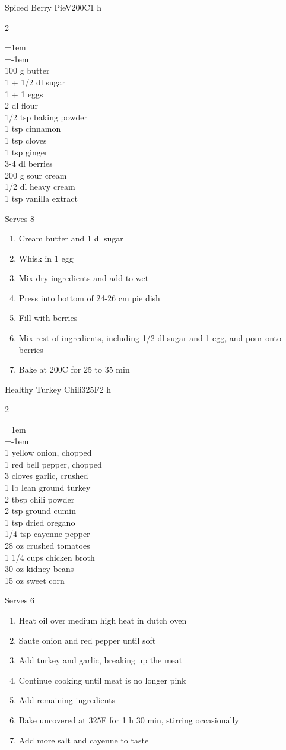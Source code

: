 \documentclass{article}
\newenvironment{recipe}[3][]
    {\begin{cardbase}[#1]{#2}{#3}
    \columnratio{0.333}
    \begin{paracol}{2}}
    {\end{paracol}\end{cardbase}}
\newenvironment{denserecipe}[3][]
    {\small
    \begin{recipe}[#1]{#2}{#3}}
    {\end{recipe}}
\newcommand{\nextcolumn}{\switchcolumn}
\newenvironment{ingredients}
    {
    \begin{obeylines}
    \vspace{\parskip}
    \setlength{\parskip}{0.25em}
    \vspace{-0.25em}
    \leftskip=1em
    \parindent=-1em}
    {\end{obeylines}}
\newenvironment{steps}
    {\begin{enumerate}[leftmargin=*,topsep=0pt]}
    {\end{enumerate}}
\newcommand{\celsius}[1]{#1\textdegree{}C}
\newcommand{\fahrenheit}[1]{#1\textdegree{}F}
\newcommand{\tag}[1]{\hspace{1em}#1}
\newcommand{\symboltag}[2]{\tag{#1\hspace{0.4em}#2}}
\newcommand{\totaltime}[1]{\symboltag{\raisebox{-0.1em}{\small\StopWatchEnd}}{#1}}
\newcommand{\preheat}[1]{\symboltag{\Topbottomheat}{#1}}
\begin{document}
\begin{denserecipe}{Spiced Berry Pie}{\tag{V}\preheat{\celsius{200}}\totaltime{1 h}}
\begin{ingredients}
100 g butter
1 + 1/2 dl sugar
1 + 1 eggs
2 dl flour
1/2 tsp baking powder
1 tsp cinnamon
1 tsp cloves
1 tsp ginger
3-4 dl berries
200 g sour cream
1/2 dl heavy cream
1 tsp vanilla extract
\end{ingredients}
\nextcolumn
Serves 8
\begin{steps}
    \item Cream butter and 1 dl sugar
    \item Whisk in 1 egg
    \item Mix dry ingredients and add to wet
    \item Press into bottom of 24-26 cm pie dish
    \item Fill with berries
    \item Mix rest of ingredients, including 1/2 dl sugar and 1 egg, and pour onto berries
    \item Bake at \celsius{200} for 25 to 35 min
\end{steps}
\end{denserecipe}

\begin{denserecipe}{Healthy Turkey Chili}{\preheat{\fahrenheit{325}\totaltime{2 h}}}
\begin{ingredients}
1 yellow onion, chopped
1 red bell pepper, chopped
3 cloves garlic, crushed
1 lb lean ground turkey
2 tbsp chili powder
2 tsp ground cumin
1 tsp dried oregano
1/4 tsp cayenne pepper
28 oz crushed tomatoes
1 1/4 cups chicken broth
30 oz kidney beans
15 oz sweet corn
\end{ingredients}
\nextcolumn
Serves 6
\begin{steps}
    \item Heat oil over medium high heat in dutch oven
    \item Saute onion and red pepper until soft
    \item Add turkey and garlic, breaking up the meat
    \item Continue cooking until meat is no longer pink
    \item Add remaining ingredients
    \item Bake uncovered at \fahrenheit{325} for 1 h 30 min, stirring occasionally
    \item Add more salt and cayenne to taste
\end{steps}
\end{denserecipe}
\end{document}

